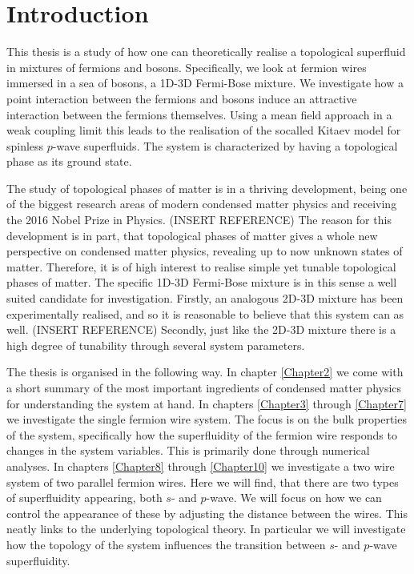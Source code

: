 
\chapter{Introduction} %

\label{Chapter1} %



This thesis is a study of how one can theoretically realise a topological superfluid in mixtures of fermions and bosons. Specifically, we look at fermion wires immersed in a sea of bosons, a 1D-3D Fermi-Bose mixture. We investigate how a point interaction between the fermions and bosons induce an attractive interaction between the fermions themselves. Using a mean field approach in a weak coupling limit this leads to the realisation of the socalled Kitaev model for spinless $p$-wave superfluids. The system is characterized by having a topological phase as its ground state. 

The study of topological phases of matter is in a thriving development, being one of the biggest research areas of modern condensed matter physics and receiving the 2016 Nobel Prize in Physics. (INSERT REFERENCE) The reason for this development is in part, that topological phases of matter gives a whole new perspective on condensed matter physics, revealing up to now unknown states of matter. Therefore, it is of high interest to realise simple yet tunable topological phases of matter. The specific 1D-3D Fermi-Bose mixture is in this sense a well suited candidate for investigation. Firstly, an analogous 2D-3D mixture has been experimentally realised, and so it is reasonable to believe that this system can as well. (INSERT REFERENCE) Secondly, just like the 2D-3D mixture there is a high degree of tunability through several system parameters. 

The thesis is organised in the following way. In chapter \ref{Chapter2} we come with a short summary of the most important ingredients of condensed matter physics for understanding the system at hand. In chapters \ref{Chapter3} through \ref{Chapter7} we investigate the single fermion wire system. The focus is on the bulk properties of the system, specifically how the superfluidity of the fermion wire responds to changes in the system variables. This is primarily done through numerical analyses. In chapters \ref{Chapter8} through \ref{Chapter10} we investigate a two wire system of two parallel fermion wires. Here we will find, that there are two types of superfluidity appearing, both $s$- and $p$-wave. We will focus on how we can control the appearance of these by adjusting the distance between the wires. This neatly links to the underlying topological theory. In particular we will investigate how the topology of the system influences the transition between $s$- and $p$-wave superfluidity.   